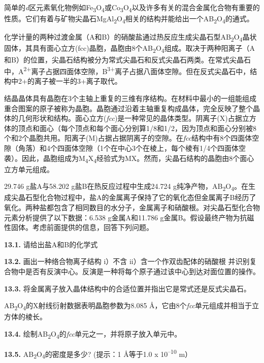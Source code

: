 简单的\textit{d}区元素氧化物例如Fe\textsubscript{3}O\textsubscript{4}或Co\textsubscript{3}O\textsubscript{4}以及许多有关的混合金属化合物有重要的性质。它们有着与矿物尖晶石MgAl\textsubscript{2}O\textsubscript{4}相关的结构并能给出一个AB\textsubscript{2}O\textsubscript{4}的通式。

化学计量的两种过渡金属（A和B）的硝酸盐通过热反应生成尖晶石型AB\textsubscript{2}O\textsubscript{4}晶状固体，其具有面心立方(fcc)晶胞，晶胞由8个AB\textsubscript{2}O\textsubscript{4}组成。取决于两种阳离子（A和B）的位置，尖晶石结构被分为常式尖晶石和反式尖晶石两类。在常式尖晶石中，A\textsuperscript{2+}离子占据四面体空隙，B\textsuperscript{3+}离子占据八面体空隙。但在反式尖晶石中，结构中2+的离子被一半的3+离子取代。

结晶晶体具有晶胞在3个主轴上重复的三维有序结构。在材料中最小的一组能组成重合图案的原子被称为晶胞。晶胞通过沿着主轴重复构成晶体，完全反映了整个晶体的几何形状和结构。面心立方(\textit{fcc})是一种常见的晶体类型。阴离子(X)占据立方体的顶点和面心（每个顶点和每个面心分别算1/8和1/2，因为顶点和面心分别被8个和2个晶胞共用。阳离子(M)占据占据阴离子的空隙。在\textit{fcc}结构中有8个四面体空隙（角落）和4个四面体空隙（1个在中心3个在棱上，每个棱有1/4个四面体空袭）。因此，晶胞组成为M\textsubscript{4}X\textsubscript{4}经验式为MX。然而，尖晶石结构的晶胞由8个面心立方单元组成。

29.746 g盐A与58.202 g盐B在热反应过程中生成24.724 g纯净产物，AB\textsubscript{2}O\textsubscript{4}。在生成尖晶石型化合物过程中，盐A的金属离子保持了它的氧化态但金属离子B经历了氧化。两种盐都包含了相同数目的水分子，金属离子和硝酸根。对尖晶石型化合物元素分析提供了以下数据：6.538 g金属A和11.786 g金属B。假设最终产物为抗磁性固体。考虑前面提供的信息，回答下列问题。

\noindent\textbf{13.1.} 请给出盐A和B的化学式

\noindent\textbf{13.2.} 画出一种络合物离子结构 i）不含
ii）含一个作双齿配体的硝酸根
并识别复合物中是否有反演中心。反演是一种将每个原子通过该中心到达对面位置的操作。

\noindent\textbf{13.3.}
将金属离子放入晶体结构中的合适位置并指出它是常式还是反式尖晶石。

AB\textsubscript{2}O\textsubscript{4}的X射线衍射数据表明晶胞参数为8.085 \AA，它由8个\textit{fcc}单元组成并相当于立方体的棱长。

\noindent\textbf{13.4.}
绘制AB\textsubscript{2}O\textsubscript{4}的\textit{fcc}单元之一，并将原子放入单元中。

\noindent\textbf{13.5.} AB\textsubscript{2}O\textsubscript{4}的密度是多少?
(提示：1 \AA 等于1.0 x 10\textsuperscript{--10} m）

